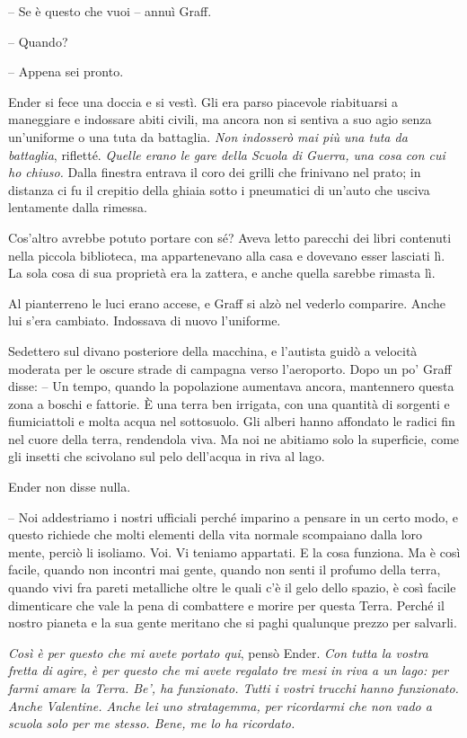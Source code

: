 {-- Se è questo che vuoi -- annuì Graff.}

{-- Quando?}

{-- Appena sei pronto.}

{Ender si fece una doccia e si vestì. Gli era parso piacevole
	riabituarsi a maneggiare e indossare abiti civili, ma ancora non si
	sentiva a suo agio senza un'uniforme o una tuta da battaglia. \emph{Non
		indosserò mai più una tuta da battaglia}, \emph{} rifletté. \emph{Quelle
		erano le gare della Scuola di Guerra, una cosa con cui ho chiuso.} Dalla
	finestra entrava il coro dei grilli che frinivano nel prato; in distanza
	ci fu il crepitio della ghiaia sotto i pneumatici di un'auto che usciva
	lentamente dalla rimessa.}

{Cos'altro avrebbe potuto portare con sé? Aveva letto parecchi dei libri
	contenuti nella piccola biblioteca, ma appartenevano alla casa e
	dovevano esser lasciati lì. La sola cosa di sua proprietà era la
	zattera, e anche quella sarebbe rimasta lì.}

{Al pianterreno le luci erano accese, e Graff si alzò nel vederlo
	comparire. Anche lui s'era cambiato. Indossava di nuovo l'uniforme.}

{Sedettero sul divano posteriore della macchina, e l'autista guidò a
	velocità moderata per le oscure strade di campagna verso l'aeroporto.
	Dopo un po' Graff disse: -- Un tempo, quando la popolazione aumentava
	ancora, mantennero questa zona a boschi e fattorie. È una terra ben
	irrigata, con una quantità di sorgenti e fiumiciattoli e molta acqua nel
	sottosuolo. Gli alberi hanno affondato le radici fin nel cuore della
	terra, rendendola viva. Ma noi ne abitiamo solo la superficie, come gli
	insetti che scivolano sul pelo dell'acqua in riva al lago.}

{Ender non disse nulla.}

{-- Noi addestriamo i nostri ufficiali perché imparino a pensare in un
	certo modo, e questo richiede che molti elementi della vita normale
	scompaiano dalla loro mente, perciò li isoliamo. Voi. Vi teniamo
	appartati. E la cosa funziona. Ma è così facile, quando non incontri mai
	gente, quando non senti il profumo della terra, quando vivi fra pareti
	metalliche oltre le quali c'è il gelo dello spazio, è così facile
	dimenticare che vale la pena di combattere e morire per questa Terra.
	Perché il nostro pianeta e la sua gente meritano che si paghi qualunque
	prezzo per salvarli.}

\emph{{Così è per questo che mi avete portato qui}}{, \emph{} pensò
	Ender. \emph{Con tutta la vostra fretta di agire, è per questo che mi
		avete regalato tre mesi in riva a un lago: per farmi amare la Terra.
		Be', ha funzionato. Tutti i vostri trucchi hanno funzionato. Anche
		Valentine. Anche lei uno stratagemma, per ricordarmi che non vado a
		scuola solo per me stesso. Bene, me lo ha ricordato.}}


